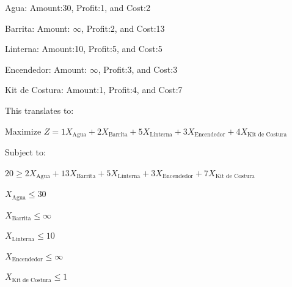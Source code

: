 \documentclass{article}
\begin{document}
Agua: Amount:30, Profit:1, and Cost:2

Barrita: Amount: $\infty$, Profit:2, and Cost:13

Linterna: Amount:10, Profit:5, and Cost:5

Encendedor: Amount: $\infty$, Profit:3, and Cost:3

Kit de Costura: Amount:1, Profit:4, and Cost:7




This translates to:

Maximize $Z = 1X_{\text{Agua}} + 2X_{\text{Barrita}} + 5X_{\text{Linterna}} + 3X_{\text{Encendedor}} + 4X_{\text{Kit de Costura}}$



Subject to:

$20 \geq 2X_{\text{Agua}} + 13X_{\text{Barrita}} + 5X_{\text{Linterna}} + 3X_{\text{Encendedor}} + 7X_{\text{Kit de Costura}}$

$X_{\text{Agua}} \leq 30$

$X_{\text{Barrita}} \leq \infty $

$X_{\text{Linterna}} \leq 10$

$X_{\text{Encendedor}} \leq \infty $

$X_{\text{Kit de Costura}} \leq 1$
\end{document}
